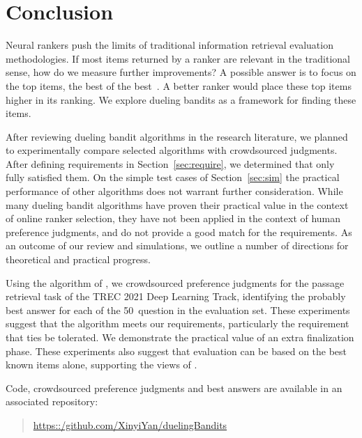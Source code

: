 \section{Conclusion}

Neural rankers push the limits of traditional information retrieval evaluation methodologies. If most items returned by a ranker are relevant in the traditional sense, how do we measure further improvements? A possible answer is to focus on the top items, the best of the best~\cite{avyc21}. A better ranker would place these top items higher in its ranking. We explore dueling bandits as a framework for finding these items.

After reviewing dueling bandit algorithms in the research literature, we planned to experimentally compare selected algorithms with crowdsourced judgments. After defining requirements in Section~\ref{sec:require}, we determined that only ~\citet{cvs21} fully satisfied them. On the simple test cases of Section~\ref{sec:sim} the practical performance of other algorithms does not warrant further consideration. While many dueling bandit algorithms have proven their practical value in the context of online ranker selection, they have not been applied in the context of human preference judgments, and do not provide a good match for the requirements. As an outcome of our review and simulations, we outline a number of directions for theoretical and practical progress.

Using the algorithm of \citet{cvs21}, we crowdsourced preference judgments for the passage retrieval task of the TREC 2021 Deep Learning Track, identifying the probably best answer for each of the 50~question in the evaluation set. These experiments suggest that the algorithm meets our requirements, particularly the requirement that ties be tolerated. We demonstrate the practical value of an extra finalization phase. These experiments also suggest that evaluation can be based on the best known items alone, supporting the views of \citet{avyc21}.

Code, crowdsourced preference judgments and best answers are available in an associated repository:

\begin{quote}
    \url{https::/github.com/XinyiYan/duelingBandits}
\end{quote}


